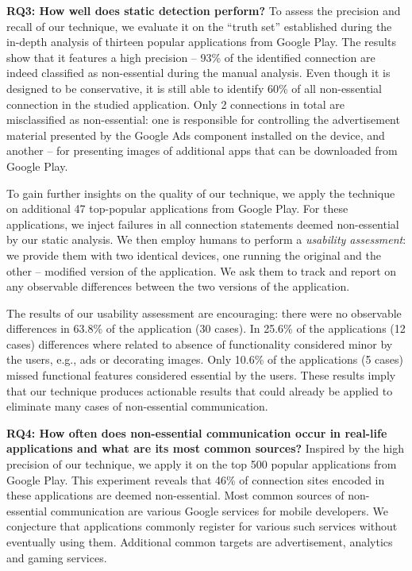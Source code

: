\noindent 
{\bf RQ3: How well does static detection perform?}
To assess the precision and recall of our technique, we evaluate it on the ``truth set'' established during the in-depth analysis of thirteen popular applications from Google Play.
The results show that it features a high precision -- 93\% of the identified connection are indeed classified as non-essential during the manual analysis. Even though it is designed to be conservative, it is still able to identify  60\% of all non-essential connection in the studied application.
Only 2 connections in total are misclassified as non-essential: one is responsible for controlling the advertisement material presented by the Google Ads component installed on the device, and another -- for presenting images of additional apps that can be downloaded from Google Play. 

To gain further insights on the quality of our technique, we apply the technique on additional 47 top-popular applications from Google Play. For these applications, we inject failures in all connection statements deemed non-essential by our static analysis. We then employ humans to perform a \emph{usability assessment}: we provide them with two identical devices, one running the original and the other -- modified version of the application. We ask them to track and report on any observable differences between the two versions of the application. 

The results of our usability assessment are encouraging: there were no observable differences in 63.8\% of the application (30 cases). In 25.6\% of the applications (12 cases) differences where related to absence of functionality considered minor by the users, e.g., ads or decorating images. Only 10.6\% of the applications (5 cases) missed functional features considered essential by the users. 
These results imply that our technique produces actionable results that could already be applied to eliminate many cases of non-essential communication. 


\noindent 
{\bf RQ4: How often does non-essential communication occur in real-life applications and what are its most common sources?}
Inspired by the high precision of our technique, we apply it on the top 500 popular applications from Google Play. This experiment reveals that 46\% of connection sites encoded in these applications 
are deemed non-essential.
Most common sources of non-essential communication are various Google services for mobile developers. We conjecture 
that applications commonly register for various such services without eventually using them. 
Additional common targets are advertisement, analytics and gaming services. 

